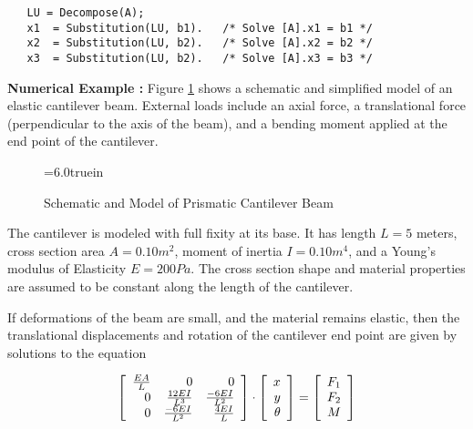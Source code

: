 \begin{footnotesize}
\begin{verbatim}
   LU = Decompose(A);
   x1  = Substitution(LU, b1).   /* Solve [A].x1 = b1 */
   x2  = Substitution(LU, b2).   /* Solve [A].x2 = b2 */
   x3  = Substitution(LU, b2).   /* Solve [A].x3 = b3 */
\end{verbatim}
\end{footnotesize}

\vspace{0.15 in}\noindent
{\bf Numerical Example :} Figure \ref{fig:prismatic-beam} shows
a schematic and simplified model of an elastic cantilever beam.
External loads include an axial force, a translational
force (perpendicular to the axis of the beam),
and a bending moment applied at the end point of the cantilever.

\vspace{0.10 in}
\begin{figure} [h]
\epsfxsize=6.0truein
\centerline{}
\caption{Schematic and Model of Prismatic Cantilever Beam}
\label{fig:prismatic-beam}
\end{figure}

\vspace{0.15 in}\noindent
The cantilever is modeled with full fixity at its base.
It has length $L = 5$ meters,
cross section area $A = 0.10 m^2$,
moment of inertia $I = 0.10 m^4$,
and a Young's modulus of Elasticity $E = 200 Pa$.
The cross section shape and material properties are
assumed to be constant along the length of the cantilever.

\vspace{0.15 in}
\noindent\hspace{0.50 in}
If deformations of the beam are small, and the material remains
elastic, then the translational displacements and rotation of
the cantilever end point are given by solutions to the equation

\begin{equation}
\left[
\begin{array}{rrr}
{{EA} \over L} &                     0  &                0     \\
              0 & {{12EI \over {L^3}}}  & {{-6EI} \over {L^2}} \\
              0 & {{-6EI \over {L^2}}}  & {{4EI} \over L}      \\
\end{array}
\right] \cdot \left[
\begin{array}{r}
x \\
y \\
\theta \\
\end{array}
\right] = \left[
\begin{array}{r}
F_1 \\
F_2 \\
  M \\
\end{array}
\right] 
\end{equation}

